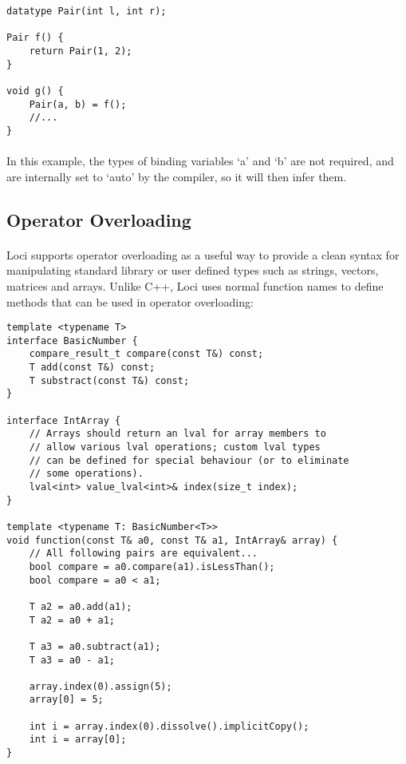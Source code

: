 \documentclass[12pt,twoside,notitlepage]{report}
\begin{document}
\begin{lstlisting}
datatype Pair(int l, int r);

Pair f() {
	return Pair(1, 2);
}

void g() {
	Pair(a, b) = f();
	//...
}
\end{lstlisting}

\paragraph{}
In this example, the types of binding variables `a' and `b' are not required, and are internally set to `auto' by the compiler, so it will then infer them.

\clearpage

\subsection{Operator Overloading}

\paragraph{}
Loci supports operator overloading as a useful way to provide a clean syntax for manipulating standard library or user defined types such as strings, vectors, matrices and arrays. Unlike C++, Loci uses normal function names to define methods that can be used in operator overloading:

\begin{lstlisting}
template <typename T>
interface BasicNumber {
	compare_result_t compare(const T&) const;
	T add(const T&) const;
	T substract(const T&) const;
}

interface IntArray {
	// Arrays should return an lval for array members to
	// allow various lval operations; custom lval types
	// can be defined for special behaviour (or to eliminate
	// some operations).
	lval<int> value_lval<int>& index(size_t index);
}

template <typename T: BasicNumber<T>>
void function(const T& a0, const T& a1, IntArray& array) {
	// All following pairs are equivalent...
	bool compare = a0.compare(a1).isLessThan();
	bool compare = a0 < a1;
	
	T a2 = a0.add(a1);
	T a2 = a0 + a1;
	
	T a3 = a0.subtract(a1);
	T a3 = a0 - a1;
	
	array.index(0).assign(5);
	array[0] = 5;
	
	int i = array.index(0).dissolve().implicitCopy();
	int i = array[0];
}
\end{lstlisting}
\end{document}
